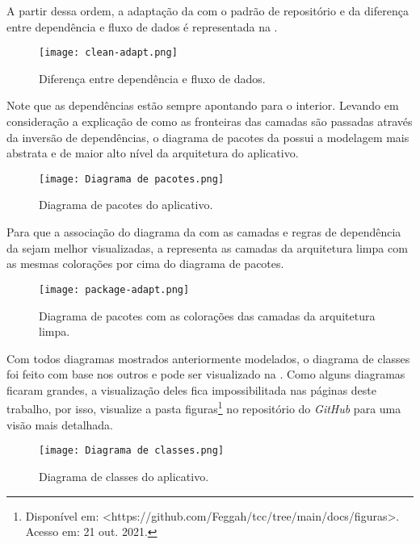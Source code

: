 A partir dessa ordem, a adaptação da  com o padrão de repositório e da diferença entre dependência e fluxo de dados é representada na .

\begin{figure}[!htb]
  \centering
  \texttt{[image: clean-adapt.png]}
  \caption{Diferença entre dependência e fluxo de dados.}
  \label{fig:cleanadapt}
\end{figure}

Note que as dependências estão sempre apontando para o interior. Levando em consideração a explicação de como as fronteiras das camadas são passadas através da inversão de dependências, o diagrama de pacotes da  possui a modelagem mais abstrata e de maior alto nível da arquitetura do aplicativo. 

\begin{figure}[!htb]
  \centering
  \texttt{[image: Diagrama de pacotes.png]}
  \caption{Diagrama de pacotes do aplicativo.}
  \label{fig:package}
\end{figure}

Para que a associação do diagrama da  com as camadas e regras de dependência da  sejam melhor visualizadas, a  representa as camadas da arquitetura limpa com as mesmas colorações por cima do diagrama de pacotes.

\begin{figure}[!htb]
  \centering
  \texttt{[image: package-adapt.png]}
  \caption{Diagrama de pacotes com as colorações das camadas da arquitetura limpa.}
  \label{fig:package2}
\end{figure}

Com todos diagramas mostrados anteriormente modelados, o diagrama de classes foi feito com base nos outros e pode ser visualizado na . Como alguns diagramas ficaram grandes, a visualização deles fica impossibilitada nas páginas deste trabalho, por isso, visualize a pasta figuras\footnote{Disponível em: <https://github.com/Feggah/tcc/tree/main/docs/figuras>. Acesso em: 21 out. 2021.} no repositório do \textit{GitHub} para uma visão mais detalhada.

\begin{figure}[!htb]
  \centering
  \texttt{[image: Diagrama de classes.png]}
  \caption{Diagrama de classes do aplicativo.}
  \label{fig:diagramadeclasses}
\end{figure}

